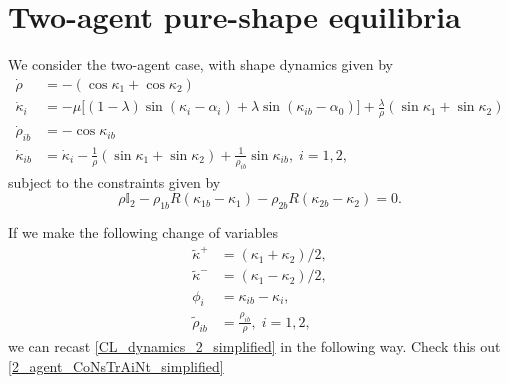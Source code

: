 \section{Two-agent pure-shape equilibria}
We consider the two-agent case, with shape dynamics given by
\begin{align}
\dot{\rho} &= - (\cos\kappa_1 + \cos\kappa_2) \\
\dot{\kappa}_i &= - \mu \Big[(1 - \lambda)\sin(\kappa_i - \alpha_i) + \lambda \sin(\kappa_{ib} - \alpha_0) \Big] + \frac{\lambda}{\rho}(\sin\kappa_1 + \sin\kappa_2) \\
\dot{\rho}_{ib} &= - \cos\kappa_{ib}  \\
\dot{\kappa}_{ib} &= \dot{\kappa}_i - \frac{1}{\rho}(\sin\kappa_1 + \sin\kappa_2) + \frac{1}{\rho_{ib}} \sin\kappa_{ib},  \; i=1,2,
\label{CL_dynamics_2_simplified}
\end{align}
subject to the constraints given by
\begin{equation}
\rho \mathbb{I}_2 - \rho_{1b} R(\kappa_{1b} - \kappa_1) - \rho_{2b} R(\kappa_{2b} - \kappa_{2}) = 0. 
\label{2_agent_CoNsTrAiNt_simplified}
\end{equation}

If we make the following change of variables
\begin{align}
\tilde{\kappa}^+ &= (\kappa_1 + \kappa_2)/2, \nonumber \\
\tilde{\kappa}^- &= (\kappa_1 - \kappa_2)/2, \nonumber \\
\phi_{i} &= \kappa_{ib} - \kappa_i, \nonumber \\
\tilde{\rho}_{ib} &= \frac{\rho_{ib} }{\rho}, \; i=1,2,
\end{align}
we can recast \eqref{CL_dynamics_2_simplified} in the following way. Check this out \eqref{2_agent_CoNsTrAiNt_simplified}
  
  
  
  
  
  
  
  
  
  
  
  
  
  
  
  
  
  
  
  
  
  
  
  
